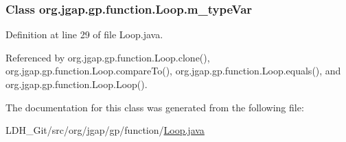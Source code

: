 \hypertarget{classorg_1_1jgap_1_1gp_1_1function_1_1_loop_a70ca2857d065b0e60e3bc89a4c82b13f}{
\subsubsection[{m\-\_\-type\-Var}]{\setlength{\rightskip}{0pt plus 5cm}Class org.\-jgap.\-gp.\-function.\-Loop.\-m\-\_\-type\-Var\hspace{0.3cm}{\ttfamily [private]}}}\label{classorg_1_1jgap_1_1gp_1_1function_1_1_loop_a70ca2857d065b0e60e3bc89a4c82b13f}


Definition at line 29 of file Loop.\-java.



Referenced by org.\-jgap.\-gp.\-function.\-Loop.\-clone(), org.\-jgap.\-gp.\-function.\-Loop.\-compare\-To(), org.\-jgap.\-gp.\-function.\-Loop.\-equals(), and org.\-jgap.\-gp.\-function.\-Loop.\-Loop().



The documentation for this class was generated from the following file\-:\begin{DoxyCompactItemize}
\item 
L\-D\-H\-\_\-\-Git/src/org/jgap/gp/function/\hyperlink{_loop_8java}{Loop.\-java}\end{DoxyCompactItemize}
